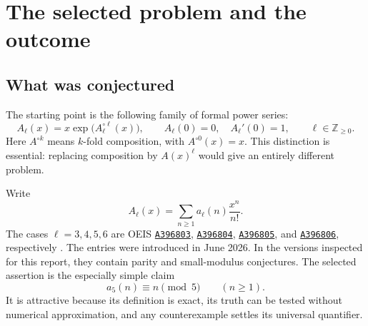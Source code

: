 \documentclass[11pt,letterpaper]{article}
\theoremstyle{definition}
\theoremstyle{remark}
\newcommand{\Z}{\mathbb Z}
\newcommand{\oeis}[1]{\href{https://oeis.org/#1}{\texttt{#1}}}
\begin{document}
\begin{abstract}
We study the integer coefficients of the formal functional equation
$A_\ell=x\exp(A_\ell^{\circ\ell})$, where the superscript denotes
composition, not an ordinary power. Four recent OEIS entries attach a
collection of congruence conjectures to the cases $\ell=3,4,5,6$.
We disprove the proposed modulo-$5$ identity for $\ell=5$, determine its
complete infinite set of exceptions, and prove the other eleven
currently conjectural assertions recorded in those entries. The main
method gives considerably more: a coefficient modulo $p^\alpha$ is a
weighted sum over typed rooted trees on fewer than $p^\alpha$ labels.
Consequently every sequence in the family is eventually periodic modulo
$p^\alpha$, with period dividing $p^\alpha(p-1)$ and a uniform onset bound
$p^\alpha$. The ordinary residue generating functions are rational.
We also prove periodicity in the iteration parameter modulo the square
of the modulus, and classify exactly when $a_\ell(n)\equiv n\pmod p$
holds for every $n$: there is no restriction for $p=2$, the condition is
$3\mid\ell$ for $p=3$, and it is $p^2\mid\ell$ for every prime $p\ge5$.
The first counterexample is checked by two independent exact formal-series
algorithms. A reproducible test suite performs 29,122 exact-arithmetic
assertions. The proofs, rather than the finite tests, establish the
infinite statements.
\end{abstract}

\tableofcontents
\newpage

\section{The selected problem and the outcome}
\subsection{What was conjectured}
The starting point is the following family of formal power series:
\begin{equation}\label{eq:main}
 A_\ell(x)=x\exp\!\bigl(A_\ell^{\circ\ell}(x)\bigr),
 \qquad A_\ell(0)=0,\quad A_\ell'(0)=1,
 \qquad \ell\in\Z_{\ge0}.
\end{equation}
Here $A^{\circ k}$ means $k$-fold composition, with $A^{\circ0}(x)=x$.
This distinction is essential: replacing composition by $A(x)^\ell$
would give an entirely different problem.

Write
\begin{equation}\label{eq:coeffdef}
 A_\ell(x)=\sum_{n\ge1}a_\ell(n)\frac{x^n}{n!}.
\end{equation}
The cases $\ell=3,4,5,6$ are OEIS
\oeis{A396803}, \oeis{A396804}, \oeis{A396805}, and
\oeis{A396806}, respectively \cite{oeis3,oeis4,oeis5,oeis6}.
The entries were introduced in June 2026. In the versions inspected for
this report, they contain parity and small-modulus conjectures.
The selected assertion is the especially simple claim
\begin{equation}\label{eq:false}
 a_5(n)\equiv n\pmod5\qquad(n\ge1).
\end{equation}
It is attractive because its definition is exact, its truth can be tested
without numerical approximation, and any counterexample settles its
universal quantifier.
\end{document}
